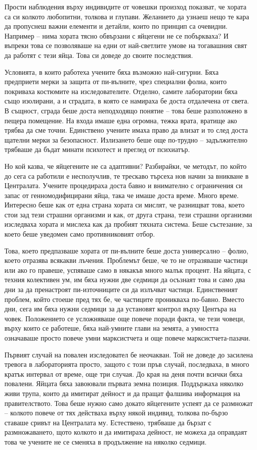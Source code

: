 \documentclass[ebook,openany,12pt]{memoir}
\begin{document}
Прости наблюдения върху индивидите от човешки произход показват, че хората са си колкото любопитни, толкова и глупави. Желанието да узнаеш нещо те кара да пропуснеш важни елементи и детайли, които по принцип са очевидни. Например – нима хората тясно обвързани с яйцегени не се побъркваха? И въпреки това се позволяваше на едни от най-светлите умове на тогавашния свят да работят с тези яйца. Това си доведе до своите последствия. 

Условията, в които работеха учените бяха възможно най-сигурни. Бяха предприети мерки за защита от пи-вълните, чрез специални фолиа, които покриваха костюмите на изследователите. Отделно, самите лаборатории бяха също изолирани, а и сградата, в която се намираха бе доста отдалечена от света. В същност, сграда беше доста неподходящо понятие – това беше разположено в пещера помещение. На входа имаше една огромна, тежка врата, вратище ако трябва да сме точни. Единствено учените имаха право да влизат и то след доста щателни мерки за безопасност. Излизането беше още по-трудно – задължително трябваше да бъдат минати психотест и преглед от психиатър.

Но кой казва, че яйцегените не са адаптивни? Разбирайки, че методът, по който до сега са работили е несполучлив,  те трескаво търсеха нов начин за вникване в Централата. Учените процедираха доста бавно и внимателно с ограничения си запас от генномодифицирани яйца, така че имаше доста време. Много време. Интересно беше как от една страна хората си мислят, че разнищват това, което стои зад тези страшни организми и как, от друга страна, тези страшни организми изследваха хората и мислеха как да пробият тяхната система. Беше състезание, за което беше уведомен само противниковият отбор. 

Това, което предпазваше хората от пи-вълните беше доста универсално – фолио, което отразява всякакви лъчения. Проблемът беше, че то не отразяваше частици или ако го правеше, успяваше само в някакъв много малък процент. На яйцата, с техния колективен ум, им бяха нужни две седмици да осъзнаят това и само два дни за да пренастроят пи-източниците си да излъчват частици. Единственият проблем, който стоеше пред тях бе, че частиците проникваха по-бавно. Вместо дни, сега им бяха нужни седмици за да установят контрол върху Центъра на човек. Положението се усложняваше още повече поради факта, че тези човеци, върху които се работеше, бяха най-умните глави на земята, а умността  означаваше просто повече умни марксистчета и още повече марксистчета-пазачи. 

Първият случай на повален изследовател бе неочакван. Той не доведе до засилена тревога в лабораторията просто, защото с този пръв случай, последваха, в много кратък интервал от време, още три случая. До края на деня почти всички бяха повалени. Яйцата бяха завоювали първата земна позиция. Поддържаха няколко живи трупа, които да имитират дейност и да пращат фалшива информация на правителството. Това беше нужно само докато яйцегените успеят да се размножат – колкото повече от тях действаха върху някой индивид, толкова по-бързо ставаше сривът на Централата му. Естествено, трябваше да бързат с размножаването, щото колкото и да имитираха дейност, не можеха да оправдаят това че учените не се сменяха в продължение на няколко седмици.
\end{document}
